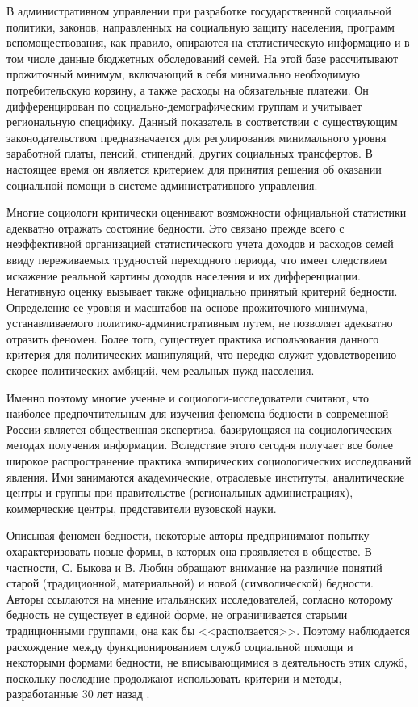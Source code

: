 В административном управлении при разработке государственной социальной 
политики, законов, направленных на социальную защиту населения, программ 
вспомоществования, как правило, опираются на статистическую информацию и в том 
числе данные бюджетных обследований семей. На этой базе рассчитывают 
прожиточный минимум, включающий в себя минимально необходимую потребительскую 
корзину, а также расходы на обязательные платежи. Он дифференцирован по 
социально-демографическим группам и учитывает региональную специфику. Данный 
показатель в соответствии с существующим законодательством предназначается 
для регулирования минимального уровня заработной платы, пенсий, стипендий, 
других социальных трансфертов. В настоящее время он является критерием для 
принятия решения об оказании социальной помощи в системе административного 
управления.

Многие социологи критически оценивают возможности официальной статистики 
адекватно отражать состояние бедности. Это связано прежде всего с 
неэффективной организацией статистического учета доходов и расходов семей 
ввиду переживаемых трудностей переходного периода, что имеет следствием 
искажение реальной картины доходов населения и их дифференциации. Негативную 
оценку вызывает также официально принятый критерий бедности. Определение ее 
уровня и масштабов на основе прожиточного минимума, устанавливаемого 
политико-административным путем, не позволяет адекватно отразить феномен. 
Более того, существует практика использования данного критерия для 
политических манипуляций, что нередко служит удовлетворению скорее 
политических амбиций, чем реальных нужд населения.

Именно поэтому многие ученые и социологи-исследователи считают, что наиболее 
предпочтительным для изучения феномена бедности в современной России является 
общественная экспертиза, базирующаяся на социологических методах получения 
информации. Вследствие этого сегодня получает все более широкое 
распространение практика эмпирических социологических исследований явления. 
Ими занимаются академические, отраслевые институты, аналитические центры и 
группы при правительстве (региональных администрациях), коммерческие центры, 
представители вузовской науки. \cite{volch}

Описывая феномен бедности, некоторые авторы предпринимают попытку 
охарактеризовать новые формы, в которых она проявляется в обществе. В 
частности, С. Быкова и В. Любин обращают внимание на различие понятий старой 
(традиционной, материальной) и новой (символической) бедности. Авторы 
ссылаются на мнение итальянских исследователей, согласно которому бедность не 
существует в единой форме, не ограничивается старыми традиционными группами, 
она как бы <<расползается>>. Поэтому наблюдается расхождение между 
функционированием служб социальной помощи и некоторыми формами бедности, 
не вписывающимися в деятельность этих служб, поскольку последние продолжают 
использовать критерии и методы, разработанные 30 лет назад \cite{volch_s1}.

